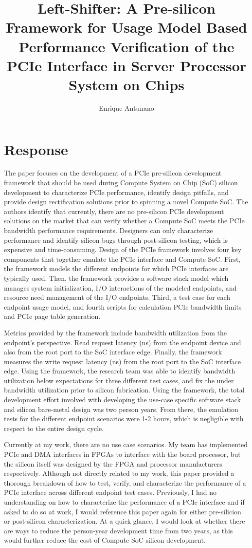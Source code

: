 \documentclass{article}
\title{Left-Shifter: A Pre-silicon Framework for Usage Model
Based Performance Verification of the PCIe Interface
in Server Processor System on Chips}
\author{Enrique Antunano}
\begin{document}
\maketitle

\section{Response}
The paper focuses on the development of a PCIe pre-silicon development framework that should be used during Compute System on Chip (SoC) silicon development to characterize PCIe performance, identify design pitfalls, and provide design rectification solutions prior to spinning a novel Compute SoC. The authors identify that currently, there are no pre-silicon PCIe development solutions on the market that can verify whether a Compute SoC meets the PCIe bandwidth performance requirements. Designers can only characterize performance and identify silicon bugs through post-silicon testing, which is expensive and time-consuming. Design of the PCIe framework involves four key components that together emulate the PCIe interface and Compute SoC. First, the framework models the different endpoints for which PCIe interfaces are typically used. Then, the framework provides a software stack model which manages system initialization, I/O interactions of the modeled endpoints, and resource need management of the I/O endpoints. Third, a test case for each endpoint usage model, and fourth scripts for calculation PCIe bandwidth limits and PCIe page table generation. 

Metrics provided by the framework include bandwidth utilization from the endpoint's perspective. Read request latency (ns) from the endpoint device and also from the root port to the SoC interface edge. Finally, the framework measures the write request latency (ns) from the root port to the SoC interface edge. Using the framework, the research team was able to identify bandwidth utilization below expectations for three different test cases, and fix the under bandwidth utilization prior to silicon fabrication. Using the framework, the total development effort involved with developing the use-case specific software stack and silicon bare-metal design was two person years. From there, the emulation tests for the different endpoint scenarios were 1-2 hours, which is negligible with respect to the entire design cycle. 

Currently at my work, there are no use case scenarios. My team has implemented PCIe and DMA interfaces in FPGAs to interface with the board processor, but the silicon itself was designed by the FPGA and processor manufacturers respectively. Although not directly related to my work, this paper provided a thorough breakdown of how to test, verify, and characterize the performance of a PCIe interface across different endpoint test cases. Previously, I had no understanding on how to characterize the performance of a PCIe interface and if asked to do so at work, I would reference this paper again for either pre-silicion or post-silicon characterization. At a quick glance, I would look at whether there are ways to reduce the person-year development time from two years, as this would further reduce the cost of Compute SoC silicon development.

\nocite{*}



\end{document}
